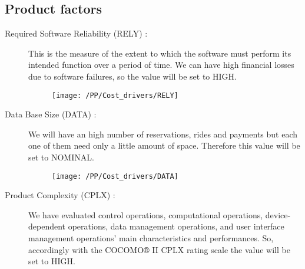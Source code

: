\subsection{Product factors}
\begin{description}
    \item [Required Software Reliability (RELY) :] This is the measure of the extent to which the software must perform its intended function over a period of time. We can have high financial losses due to software failures, so the value will be set to HIGH.
    \begin{figure}[!ht]
      \centering
      \vspace{0.2cm}
      \texttt{[image: /PP/Cost\_drivers/RELY]}\\
      \vspace{0.2cm}
      \label{fig:RELY} 
    \end{figure}
    \item [Data Base Size (DATA) :] We will have an high number of reservations, rides and payments but each one of them need only a little amount of space. Therefore this value will be set to NOMINAL.
    \begin{figure}[!ht]
      \centering
      \vspace{0.2cm}
      \texttt{[image: /PP/Cost\_drivers/DATA]}\\
      \vspace{0.2cm}
      \label{fig:DATA} 
    \end{figure}

    \item [Product Complexity (CPLX) :] We have evaluated control operations, computational operations, device-dependent operations, data management operations, and user interface management operations' main characteristics and performances. So, accordingly with the COCOMO® II CPLX rating scale the value will be set to HIGH.
	  

\end{description}
